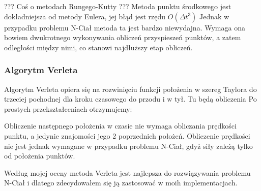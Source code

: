 \begin{center}

\end{center}

 ??? Coś o metodach Rungego-Kutty ???
Metoda punktu środkowego jest dokładniejsza od metody Eulera, jej błąd jest rzędu $ O( \Delta t ^{3} ) $
Jednak w przypadku problemu N-Ciał metoda ta jest bardzo niewydajna. Wymaga ona bowiem dwukrotnego wykonywania obliczeń przyspieszeń punktów, a zatem odległości między nimi, co stanowi najdłuższy etap obliczeń.

\subsubsection {Algorytm Verleta}
Algorytm Verleta opiera się na rozwinięciu funkcji położenia w szereg Taylora do trzeciej pochodnej dla kroku czasowego do przodu i w tył.
\linebreak
Tu będą obliczenia
\linebreak
Po prostych przekształceniach otrzymujemy:
\begin{center}

\end{center}

Obliczenie następnego położenia w czasie nie wymaga obliczania prędkości punktu, a jedynie znajomości jego 2 poprzednich położeń. 
Obliczenie prędkości nie jest jednak wymagane w przypadku problemu N-Ciał, gdyż siły zależą tylko od położenia punktów.
\linebreak


Według mojej oceny metoda Verleta jest najlepsza do rozwiązywania problemu N-Ciał i dlatego zdecydowałem się ją zastosować w moih implementacjach.
